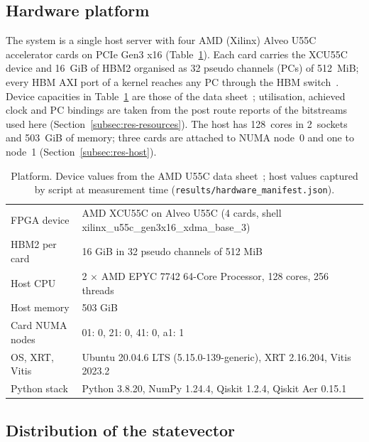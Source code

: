 \documentclass[pdflatex,sn-mathphys-num]{sn-jnl}
\newcommand{\NumHostCores}{128}
\newcommand{\NumHostRamGiB}{503}
\newcommand{\NumHostSockets}{2}
\theoremstyle{thmstyleone}
\theoremstyle{thmstylethree}
\begin{document}
\subsection{Hardware platform}\label{subsec:hw}

The system is a single host server with four AMD (Xilinx) Alveo U55C accelerator cards on PCIe Gen3 x16
(Table~\ref{tab:platform}). Each card carries the XCU55C device and 16~GiB of HBM2 organised as 32 pseudo channels
(PCs) of 512~MiB; every HBM AXI port of a kernel reaches any PC through the HBM switch~\cite{amd_ds978,amd_ug1393}.
Device capacities in Table~\ref{tab:platform} are those of the data sheet~\cite{amd_ds978}; utilisation, achieved
clock and PC bindings are taken from the post route reports of the bitstreams used here (Section~\ref{subsec:res-resources}).
The host has \NumHostCores~cores in \NumHostSockets~sockets and \NumHostRamGiB~GiB of memory; three cards are attached
to NUMA node~0 and one to node~1 (Section~\ref{subsec:res-host}).

\begin{table}[t]
\caption{Platform. Device values from the AMD U55C data sheet~\cite{amd_ds978}; host values captured by script at
measurement time (\texttt{results/hardware\_manifest.json}).}\label{tab:platform}
\begin{tabular}{@{}ll@{}}
\toprule
FPGA device & AMD XCU55C on Alveo U55C (4 cards, shell xilinx\_u55c\_gen3x16\_xdma\_base\_3) \\
HBM2 per card & 16 GiB in 32 pseudo channels of 512 MiB \\
Host CPU & 2 $\times$ AMD EPYC 7742 64-Core Processor, 128 cores, 256 threads \\
Host memory & 503 GiB \\
Card NUMA nodes & 01: 0, 21: 0, 41: 0, a1: 1 \\
OS, XRT, Vitis & Ubuntu 20.04.6 LTS (5.15.0-139-generic), XRT 2.16.204, Vitis 2023.2 \\
Python stack & Python 3.8.20, NumPy 1.24.4, Qiskit 1.2.4, Qiskit Aer 0.15.1 \\
\bottomrule
\end{tabular}
\end{table}

\subsection{Distribution of the statevector}\label{subsec:partition}
\end{document}
